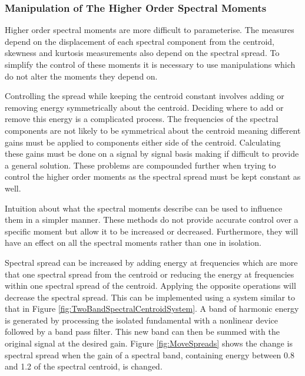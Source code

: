 		\subsubsection*{Manipulation of The Higher Order Spectral Moments}
			Higher order spectral moments are more difficult to parameterise. The measures depend on the
			displacement of each spectral component from the centroid, skewness and kurtosis measurements also
			depend on the spectral spread. To simplify the control of these moments it is necessary to use
			manipulations which do not alter the moments they depend on. 
			
			Controlling the spread while keeping the centroid constant involves adding or removing energy
			symmetrically about the centroid. Deciding where to add or remove this energy is a complicated
			process. The frequencies of the spectral components are not likely to be symmetrical about the
			centroid meaning different gains must be applied to components either side of the centroid.
			Calculating these gains must be done on a signal by signal basis making if difficult to provide a
			general solution. These problems are compounded further when trying to control the higher order
			moments as the spectral spread must be kept constant as well.

			Intuition about what the spectral moments describe can be used to influence them in a simpler
			manner. These methods do not provide accurate control over a specific moment but allow it to be
			increased or decreased.  Furthermore, they will have an effect on all the spectral moments rather
			than one in isolation. 
			
			Spectral spread can be increased by adding energy at frequencies which are more that one spectral
			spread from the centroid or reducing the energy at frequencies within one spectral spread of the
			centroid.  Applying the opposite operations will decrease the spectral spread. This can be
			implemented using a system similar to that in Figure \ref{fig:TwoBandSpectralCentroidSystem}. A
			band of harmonic energy is generated by processing the isolated fundamental with a nonlinear device
			followed by a band pass filter. This new band can then be summed with the original signal at the
			desired gain. Figure \ref{fig:MoveSpreads} shows the change is spectral spread when the gain of a
			spectral band, containing energy between 0.8 and 1.2 of the spectral centroid, is changed.

